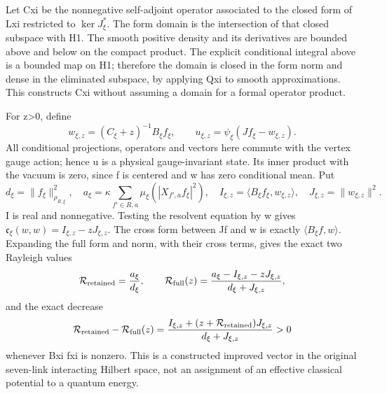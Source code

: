 \documentclass[
  11pt,
]{article}
\begin{document}
Let Cxi be the nonnegative self-adjoint operator associated to the
closed form of Lxi restricted to \(\ker J_\xi^*\). The form domain is
the intersection of that closed subspace with H1. The smooth positive
density and its derivatives are bounded above and below on the compact
product. The explicit conditional integral above is a bounded map on H1;
therefore the domain is closed in the form norm and dense in the
eliminated subspace, by applying Qxi to smooth approximations. This
constructs Cxi without assuming a domain for a formal operator product.

For z\textgreater0, define \[
 w_{\xi,z}=(C_\xi+z)^{-1}B_\xi f_\xi,\qquad
 u_{\xi,z}=\psi_\xi(Jf_\xi-w_{\xi,z}).
\] All conditional projections, operators and vectors here commute with
the vertex gauge action; hence u is a physical gauge-invariant state.
Its inner product with the vacuum is zero, since f is centered and w has
zero conditional mean. Put \[
 d_\xi=\|f_\xi\|_{\rho_{R,\xi}}^2,\quad
 a_\xi=\kappa\sum_{f'\in R,a}\mu_\xi(|X_{f',a}f_\xi|^2),
 \quad I_{\xi,z}=\langle B_\xi f_\xi,w_{\xi,z}\rangle,
 \quad J_{\xi,z}=\|w_{\xi,z}\|^2.
\] I is real and nonnegative. Testing the resolvent equation by w gives
\(\mathfrak c_\xi(w,w)=I_{\xi,z}-zJ_{\xi,z}\). The cross form between Jf
and w is exactly \(\langle B_\xi f,w\rangle\). Expanding the full form
and norm, with their cross terms, gives the exact two Rayleigh values \[
 \mathcal R_{\rm retained}=\frac{a_\xi}{d_\xi},\qquad
 \mathcal R_{\rm full}(z)=
 \frac{a_\xi-I_{\xi,z}-zJ_{\xi,z}}{d_\xi+J_{\xi,z}},
\] and the exact decrease \[
 \mathcal R_{\rm retained}-\mathcal R_{\rm full}(z)
 =\frac{I_{\xi,z}+(z+\mathcal R_{\rm retained})J_{\xi,z}}
        {d_\xi+J_{\xi,z}}>0
\] whenever Bxi fxi is nonzero. This is a constructed improved vector in
the original seven-link interacting Hilbert space, not an assignment of
an effective classical potential to a quantum energy.
\end{document}
